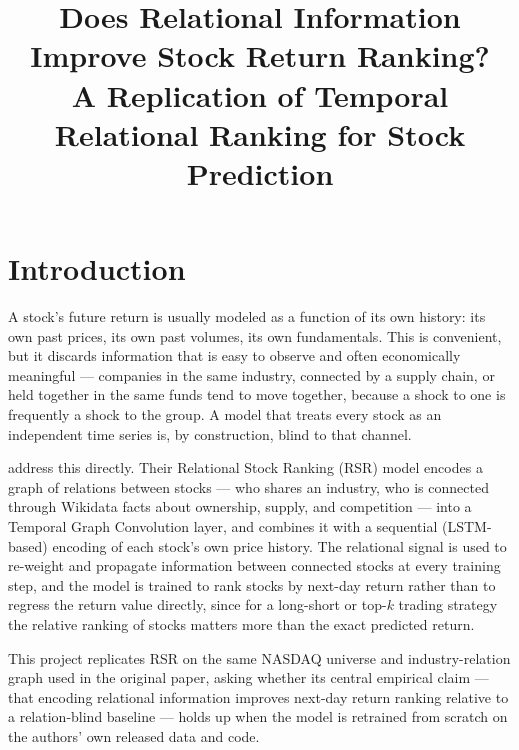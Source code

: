 \documentclass[11pt]{article}
\title{Does Relational Information Improve Stock Return Ranking?\\
\large A Replication of Temporal Relational Ranking for Stock Prediction}
\author{}
\date{}
\begin{document}
\maketitle

\begin{abstract}
\end{abstract}

\section{Introduction}
\label{sec:intro}

A stock's future return is usually modeled as a function of its own history: its own past
prices, its own past volumes, its own fundamentals. This is convenient, but it discards
information that is easy to observe and often economically meaningful --- companies in the same
industry, connected by a supply chain, or held together in the same funds tend to move together,
because a shock to one is frequently a shock to the group. A model that treats every stock as an
independent time series is, by construction, blind to that channel.

\citet{feng2019temporal} address this directly. Their Relational Stock Ranking (RSR) model
encodes a graph of relations between stocks --- who shares an industry, who is connected through
Wikidata facts about ownership, supply, and competition --- into a Temporal Graph Convolution
layer, and combines it with a sequential (LSTM-based) encoding of each stock's own price history.
The relational signal is used to re-weight and propagate information between connected stocks at
every training step, and the model is trained to rank stocks by next-day return rather than to
regress the return value directly, since for a long-short or top-$k$ trading strategy the relative
ranking of stocks matters more than the exact predicted return.

This project replicates RSR on the same NASDAQ universe and industry-relation graph used in the
original paper, asking whether its central empirical claim --- that encoding relational
information improves next-day return ranking relative to a relation-blind baseline --- holds up
when the model is retrained from scratch on the authors' own released data and code.
\end{document}
